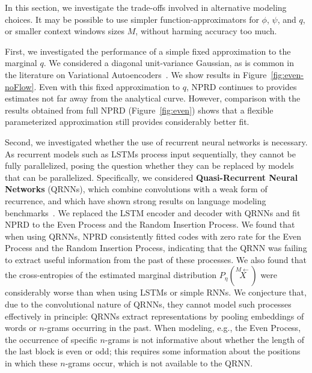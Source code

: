 \documentclass[entropy,article,submit,moreauthors,pdftex,10pt,a4paper]{Definitions/mdpi}
\newif \ifcomment
\newcommand\mhahn[1]{\ifcomment{{\color{red}(#1)}}\else{}\fi}
\newcommand\rljf[1]{\ifcomment{{\color{blue}(#1)}}\else{}\fi}
\newcommand{\key}{\textbf}
\newcommand{\finitepast}{\stackrel{\scriptscriptstyle{M}\leftarrow}{X}}%
\begin{document}
In this section, we investigate the trade-offs involved in alternative modeling choices. It may be possible to use simpler function-approximators for $\phi$, $\psi$, and $q$, or smaller context windows sizes $M$, without harming accuracy too much.

First, we investigated the performance of a simple fixed approximation to the marginal $q$.
We considered a diagonal unit-variance Gaussian, as is common in the literature on Variational Autoencoders~\citep{kingma-auto-encoding-2014}.
We show results in Figure~\ref{fig:even-noFlow}.
Even with this fixed approximation to $q$, NPRD continues to provides estimates not far away from the analytical curve.
However, comparison with the results obtained from full NPRD (Figure~\ref{fig:even}) shows that a flexible parameterized approximation still provides considerably better fit.

Second, we investigated whether the use of recurrent neural networks is necessary.
As recurrent models such as LSTMs process input sequentially, they cannot be fully parallelized, posing the question whether they can be replaced by models that can be parallelized.
Specifically, we considered \key{Quasi-Recurrent Neural Networks} (QRNNs), which combine convolutions with a weak form of recurrence, and which have shown strong results on language modeling benchmarks~\citep{bradbury2017quasi}.
We replaced the LSTM encoder and decoder with QRNNs and fit NPRD to the Even Process and the Random Insertion Process.
We found that when using QRNNs, NPRD consistently fitted codes with zero rate for the Even Process and the Random Insertion Process, indicating that the QRNN was failing to extract useful information from the past of these processes.
We also found that the cross-entropies of the estimated marginal distribution $P_\eta(\finitepast)$ were considerably worse than when using LSTMs or simple RNNs.
We conjecture that, due to the convolutional nature of QRNNs, they cannot model such processes effectively in principle:
QRNNs extract representations by pooling embeddings of words or $n$-grams occurring in the past.
When modeling, e.g., the Even Process, the occurrence of specific $n$-grams is not informative about whether the length of the last block is even or odd; this requires some information about the positions in which these $n$-grams occur, which is not available to the QRNN.
\rljf{We'll want a bit more detail on this: someone might think we just made some mistake in applying the QRNNs.} \mhahn{I've tried to make it more explicit, is this okay?}
\end{document}
